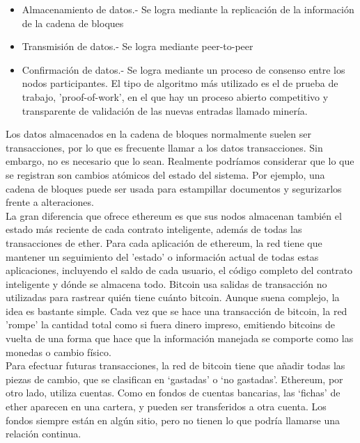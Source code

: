 \documentclass[11pt,a4paper]{article}
\begin{document}
\begin{itemize}
\item Almacenamiento de datos.- Se logra mediante la replicación de la información de la cadena de bloques
\item Transmisión de datos.- Se logra mediante peer-to-peer
\item Confirmación de datos.- Se logra mediante un proceso de consenso entre los nodos participantes. El tipo de algoritmo más utilizado es el de prueba de trabajo, 'proof-of-work', en el que hay un proceso abierto competitivo y transparente de validación de las nuevas entradas llamado minería.
\end{itemize}
Los datos almacenados en la cadena de bloques normalmente suelen ser transacciones, por lo que es frecuente llamar a los datos transacciones. Sin embargo, no es necesario que lo sean. Realmente podríamos considerar que lo que se registran son cambios atómicos del estado del sistema. Por ejemplo, una cadena de bloques puede ser usada para estampillar documentos y segurizarlos frente a alteraciones.\\

La gran diferencia que ofrece ethereum es que sus nodos almacenan también el estado más reciente de cada contrato inteligente, además de todas las transacciones de ether. Para cada aplicación de ethereum, la red tiene que mantener un seguimiento del 'estado' o información actual de todas estas aplicaciones, incluyendo el saldo de cada usuario, el código completo del contrato inteligente y dónde se almacena todo. Bitcoin usa salidas de transacción no utilizadas para rastrear quién tiene cuánto bitcoin.
Aunque suena complejo, la idea es bastante simple. Cada vez que se hace una transacción de bitcoin, la red 'rompe' la cantidad total como si fuera dinero impreso, emitiendo bitcoins de vuelta de una forma que hace que la información manejada se comporte como las monedas o cambio físico.\\

Para efectuar futuras transacciones, la red de bitcoin tiene que añadir todas las piezas de cambio, que se clasifican en ‘gastadas’ o ‘no gastadas’. Ethereum, por otro lado, utiliza cuentas. Como en fondos de cuentas bancarias, las ‘fichas’ de ether aparecen en una cartera, y pueden ser transferidos a otra cuenta. Los fondos siempre están en algún sitio, pero no tienen lo que podría llamarse una relación continua.
\end{document}
